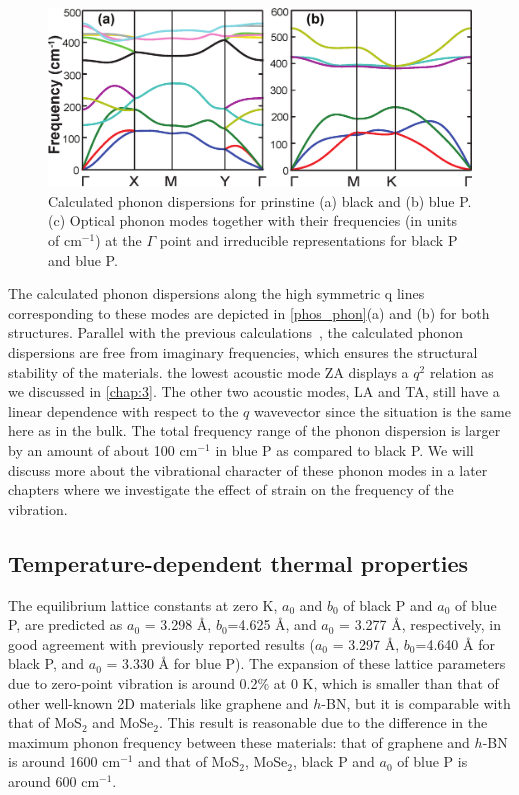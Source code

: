 \begin{figure}[htbp]
\centering
\includegraphics[width=0.8\linewidth]{phos_phon.eps}%
\caption{Calculated phonon dispersions for prinstine (a) black and (b) blue P. (c) Optical phonon modes together with their frequencies (in units of cm$^{-1}$) at the $\Gamma$ point and irreducible representations for black P and blue P.\label{phos_phon}}
\end{figure}

The calculated phonon dispersions along the high symmetric q lines corresponding to these modes are depicted in \autoref{phos_phon}(a) and (b) for both structures. Parallel with the previous calculations~\cite{phonon-blackP,phonon-blackP-1}, the calculated phonon dispersions are free from imaginary frequencies, which ensures the structural stability of the materials. the lowest acoustic mode ZA displays a $q^2$ relation as we discussed in \autoref{chap:3}.  The other two acoustic modes, LA and TA, still have a linear dependence with respect to the $q$ wavevector since the situation is the same here as in the bulk. The total frequency range of the phonon dispersion is larger by an amount of about 100 cm$^{-1}$ in blue P as compared to black P. We will discuss more about the vibrational character of these phonon modes in a later chapters where we investigate the effect of strain on the frequency of the vibration.

\subsection{Temperature-dependent thermal properties}

The equilibrium lattice constants at zero K, $a_0$ and $b_0$ of black P and $a_0$ of blue P, are predicted as $a_0$ = 3.298 {\AA}, $b_0$=4.625 {\AA}, and  $a_0$ = 3.277 {\AA}, respectively,  in  good agreement with previously reported results ($a_0$ = 3.297 {\AA}, $b_0$=4.640 {\AA} for black P\cite{fei,deniz3}, and  $a_0$ = 3.330 {\AA} for blue P\cite{Zhu2014}). 
The expansion of these lattice parameters due to zero-point vibration is around 0.2\% at 0 K, which is smaller than that of other well-known 2D materials like graphene and $h$-BN, but it is comparable with that of MoS$_2$ and MoSe$_2$. This result is reasonable due to the difference in the maximum phonon frequency between these materials: that of graphene and $h$-BN is around 1600 cm$^{-1}$ and that of MoS$_2$, MoSe$_2$, black P and $a_0$ of blue P is around 600 cm$^{-1}$. 

